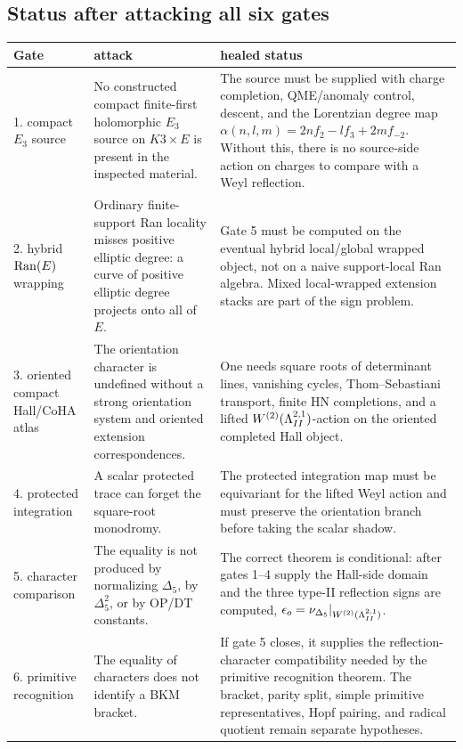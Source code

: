 \subsection{Status after attacking all six gates}

\begin{center}
\small
\begin{tabular}{p{}p{}p{}}
\hline
Gate & attack & healed status \\
\hline
1. compact \(E_3\) source &
No constructed compact finite-first holomorphic \(E_3\) source on
\(K3\times E\) is present in the inspected material. &
The source must be supplied with charge completion, QME/anomaly control,
descent, and the Lorentzian degree map
\(\alpha(n,l,m)=2nf_2-lf_3+2mf_{-2}\).  Without this, there is no
source-side action on charges to compare with a Weyl reflection. \\
2. hybrid \(\operatorname{Ran}(E)\) wrapping &
Ordinary finite-support Ran locality misses positive elliptic degree:
a curve of positive elliptic degree projects onto all of \(E\). &
Gate 5 must be computed on the eventual hybrid local/global wrapped
object, not on a naive support-local Ran algebra.  Mixed local-wrapped
extension stacks are part of the sign problem. \\
3. oriented compact Hall/CoHA atlas &
The orientation character is undefined without a strong orientation
system and oriented extension correspondences. &
One needs square roots of determinant lines, vanishing cycles,
Thom--Sebastiani transport, finite HN completions, and a lifted
\(W^{(2)}(\Lambda^{2,1}_{II})\)-action on the oriented completed Hall object. \\
4. protected integration &
A scalar protected trace can forget the square-root monodromy. &
The protected integration map must be equivariant for the lifted Weyl
action and must preserve the orientation branch before taking the scalar
shadow. \\
5. character comparison &
The equality is not produced by normalizing \(\Delta_5\), by
\(\Delta_5^2\), or by OP/DT constants. &
The correct theorem is conditional: after gates 1--4 supply the
Hall-side domain and the three type-II reflection signs are computed,
\(\epsilon_o=\nu_{\Delta_5}|_{W^{(2)}(\Lambda^{2,1}_{II})}\). \\
6. primitive recognition &
The equality of characters does not identify a BKM bracket. &
If gate 5 closes, it supplies the reflection-character compatibility
needed by the primitive recognition theorem.  The bracket, parity split,
simple primitive representatives, Hopf pairing, and radical quotient
remain separate hypotheses. \\
\hline
\end{tabular}
\end{center}


